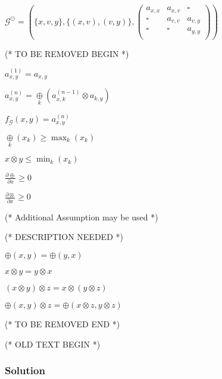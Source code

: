 \documentclass{article}
\begin{document}
\(\mathcal{G}^{\odot }=\left(\{x,v,y\},\{(x,v),(v,y)\},\left(
\begin{array}{ccc}
 a_{x,x} & a_{x,v} & \square  \\
 \square  & a_{v,v} & a_{v,y} \\
 \square  & \square  & a_{y,y} \\
\end{array}
\right)\right)\)



(* TO BE REMOVED BEGIN *)


\item \(a_{x,y}^{(1)}=a_{x,y}\)


\item \(a_{x,y}^{(n)}=\underset{k}{\oplus }\left(a_{x,k}^{(n-1)}\otimes a_{k,y}\right)\)


\item \(f_{\mathcal{G}}(x,y)=a_{x,y}^{(n)}\)


\item \(\underset{k}{\oplus }\left(x_k\right)\geqslant \max _k\left(x_k\right)\)


\item \(x\otimes y\leqslant \min _k\left(x_k\right)\)


\item \(\frac{\partial \oplus }{\partial x}\geqslant 0\)


\item \(\frac{\partial \otimes }{\partial x}\geqslant 0\)



(* Additional Assumption may be used *)



(* DESCRIPTION NEEDED *)


\item \(\oplus (x,y)=\oplus (y,x)\)


\item \(x\otimes y=y\otimes x\)


\item \((x\otimes y)\otimes z=x\otimes (y\otimes z)\)


\item \(\oplus (x,y)\otimes z=\oplus (x\otimes z,y\otimes z)\)



(* TO BE REMOVED END *)



(* OLD TEXT BEGIN *)


\subsubsection{Solution}
\end{document}
